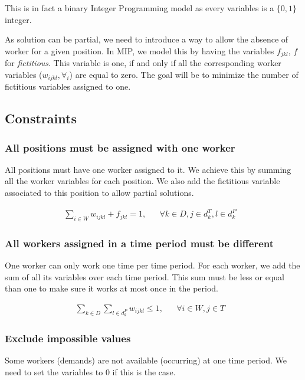 \documentclass[../../thesis.tex]{subfiles}
\begin{document}
This is in fact a binary Integer Programming model as every variables is a $\{0, 1\}$ integer.

As solution can be partial, we need to introduce a way to allow the absence of worker for a 
given position. In MIP, we model this by having the variables $f_{jkl}$, $f$ for \emph{fictitious}. This variable is one, if and only if all the 
corresponding worker variables ($w_{ijkl}, \forall_i$) are equal to zero. The goal will be to minimize 
the number of fictitious variables assigned to one.

\subsection{Constraints}

\subsubsection{All positions must be assigned with one worker}

  All positions must have one worker assigned to it. We achieve this by summing all the worker variables 
  for each position. We also add the fictitious variable associated to this position to allow partial 
  solutions.

  \begin{align}
    \sum_{i \in W} w_{ijkl} + f_{jkl} = 1, && \forall k \in D, j \in d_k^T, l \in d_k^P & \label{wc1}
  \end{align}

\subsubsection{All workers assigned in a time period must be different}

One worker can only work one time per time period. For each worker, we add the sum of all its variables 
over each time period. This sum must be less or equal than one to make sure it works at most once in the period.

\begin{align}
  \sum_{k \in D} \sum_{l \in d_k^P} w_{ijkl} \leq 1, && \forall i \in W, j \in T & \label{wc2} 
\end{align}


\subsubsection{Exclude impossible values}

Some workers (demands) are not available (occurring) at one time period. We need to set the variables to 0 if this is the case.
\end{document}
